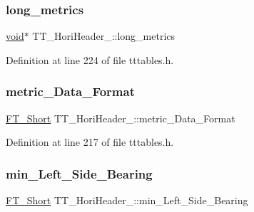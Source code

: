 \mbox{\label{struct_t_t___hori_header___a3eeb5766b461e9563b659a30e775fcc2}} 
\subsubsection{\texorpdfstring{long\_metrics}{long\_metrics}}
{\footnotesize\ttfamily \mbox{\hyperlink{_s_d_l__opengles2__gl2ext_8h_ae5d8fa23ad07c48bb609509eae494c95}{void}}$\ast$ T\+T\+\_\+\+Hori\+Header\+\_\+\+::long\+\_\+metrics}



Definition at line 224 of file tttables.\+h.

\mbox{\label{struct_t_t___hori_header___a0ed857e9629d2dfb5350a6b5976bf933}} 
\subsubsection{\texorpdfstring{metric\_Data\_Format}{metric\_Data\_Format}}
{\footnotesize\ttfamily \mbox{\hyperlink{fttypes_8h_aa7279be89046a2563cd3d4d6651fbdcf}{F\+T\+\_\+\+Short}} T\+T\+\_\+\+Hori\+Header\+\_\+\+::metric\+\_\+\+Data\+\_\+\+Format}



Definition at line 217 of file tttables.\+h.

\mbox{\label{struct_t_t___hori_header___a0e2e2bf8ca0e18b610c4eae0a647fded}} 
\subsubsection{\texorpdfstring{min\_Left\_Side\_Bearing}{min\_Left\_Side\_Bearing}}
{\footnotesize\ttfamily \mbox{\hyperlink{fttypes_8h_aa7279be89046a2563cd3d4d6651fbdcf}{F\+T\+\_\+\+Short}} T\+T\+\_\+\+Hori\+Header\+\_\+\+::min\+\_\+\+Left\+\_\+\+Side\+\_\+\+Bearing}




